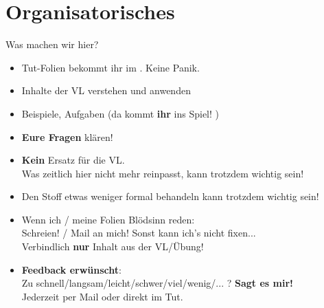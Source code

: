
\newcommand{\handout}{}





\section{Organisatorisches}


\begin{frame}[t]{Was machen wir hier?}
	\begin{itemize}[<+->]
		\item Tut-Folien bekommt ihr im \ILIAS. Keine Panik.
		\item Inhalte der VL verstehen und anwenden
		\item Beispiele, Aufgaben (da kommt \textbf{ihr} ins Spiel! \smiley)
		\item \textbf{Eure Fragen} klären! 
		\item \textbf{Kein} Ersatz für die VL. \\
			  Was zeitlich hier nicht mehr reinpasst, kann trotzdem wichtig sein!
	    \item Den Stoff etwas weniger formal behandeln \impl {} kann trotzdem wichtig sein! 
	    \item Wenn ich / meine Folien Blödsinn reden: \\
		      Schreien! / Mail an mich! \impl Sonst kann ich's nicht fixen... \frownie \\
		      Verbindlich \textbf{nur} Inhalt aus der VL/Übung! 
		\item \textbf{Feedback erwünscht}: \\
			  Zu schnell/langsam/leicht/schwer/viel/wenig/... ? \impl \textbf{Sagt es mir!}\\
			  Jederzeit per Mail oder direkt im Tut.
	\end{itemize}
\end{frame}



